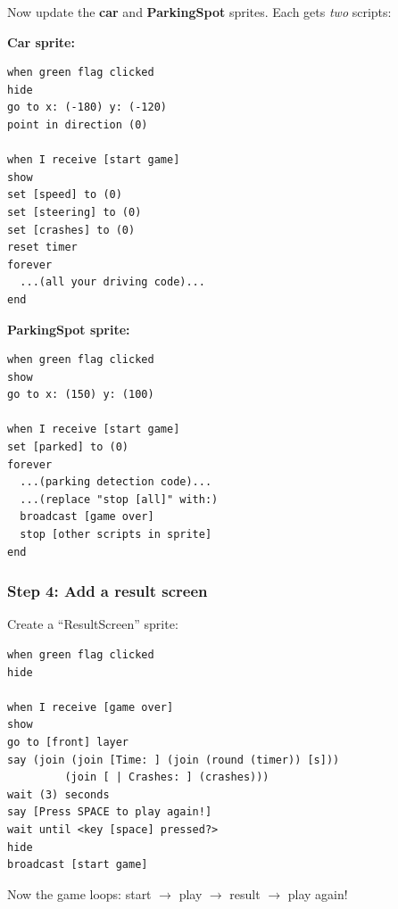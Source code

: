 \documentclass[11pt,a4paper]{article}
\begin{document}
Now update the \textbf{car} and \textbf{ParkingSpot} sprites. Each gets \emph{two} scripts:

\textbf{Car sprite:}
\begin{scratchblockbox}
\begin{lstlisting}[style=scratch]
when green flag clicked
hide
go to x: (-180) y: (-120)
point in direction (0)

when I receive [start game]
show
set [speed] to (0)
set [steering] to (0)
set [crashes] to (0)
reset timer
forever
  ...(all your driving code)...
end
\end{lstlisting}
\end{scratchblockbox}

\textbf{ParkingSpot sprite:}
\begin{scratchblockbox}
\begin{lstlisting}[style=scratch]
when green flag clicked
show
go to x: (150) y: (100)

when I receive [start game]
set [parked] to (0)
forever
  ...(parking detection code)...
  ...(replace "stop [all]" with:)
  broadcast [game over]
  stop [other scripts in sprite]
end
\end{lstlisting}
\end{scratchblockbox}

\subsubsection{Step 4: Add a result screen}

Create a ``ResultScreen'' sprite:

\begin{scratchblockbox}
\begin{lstlisting}[style=scratch]
when green flag clicked
hide

when I receive [game over]
show
go to [front] layer
say (join (join [Time: ] (join (round (timer)) [s]))
         (join [ | Crashes: ] (crashes)))
wait (3) seconds
say [Press SPACE to play again!]
wait until <key [space] pressed?>
hide
broadcast [start game]
\end{lstlisting}
\end{scratchblockbox}

Now the game loops: start $\to$ play $\to$ result $\to$ play again!
\end{document}
